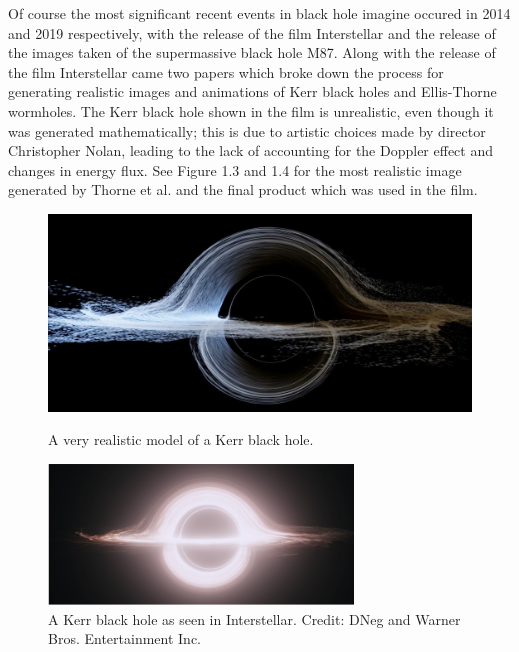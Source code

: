 \documentclass[oneside,openright,frontopenright, singlespacing]{dmathesis}
\begin{document}
\vspace{1em}
	Of course the most significant recent events in black hole imagine occured in 2014 and 2019 respectively, with the release of the film Interstellar and the release of the images taken of the supermassive black hole M87. Along with the release of the film Interstellar came two papers \cite{thorne2015gravitational}\cite{thorne2015visualizing} which broke down the process for generating realistic images and animations of Kerr black holes and Ellis-Thorne wormholes. The Kerr black hole shown in the film is unrealistic, even though it was generated mathematically; this is due to artistic choices made by director Christopher Nolan, leading to the lack of accounting for the Doppler effect and changes in energy flux. See Figure 1.3 and 1.4 for the most realistic image generated by Thorne et al. and the final product which was used in the film.

\begin{figure}[!ht]
	\centering
	\begin{minipage}{0.5\textwidth}
		\centering
		\includegraphics[width=0.9\linewidth]{img/realistic-kerr}
		\caption{A very realistic model of a Kerr black hole. \cite{Interstellarpaper1}}
	\end{minipage}%
	\hfill
	\begin{minipage}{0.5\textwidth}
		\centering
		\includegraphics[width=0.9\linewidth]{img/used-kerr}
		\caption{A Kerr black hole as seen in Interstellar. Credit: DNeg and Warner Bros. Entertainment Inc.}
	\end{minipage}
\end{figure}
\end{document}

